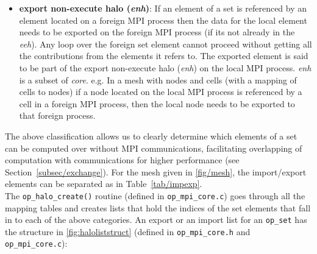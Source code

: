 \documentclass[11pt]{article}
\begin{document}
\begin{itemize}
\item \textbf{export non-execute halo (\textit{enh})}: If an element of a set is
referenced by an element located on a foreign MPI process then the data for the
local element needs to be exported on the foreign MPI process (if its not
already in the \textit{eeh}). Any loop over the foreign set element cannot
proceed without getting all the contributions from the elements it refers to.
The exported element is said to be part of the export non-execute halo
(\textit{enh}) on the local MPI process. \textit{enh} is a subset of
\textit{core}. e.g. In a mesh with nodes and cells (with a mapping of cells to
nodes) if a node located on the local MPI process is referenced by a cell in a
foreign MPI process, then the local node needs to be exported to that foreign
process.
\end{itemize}

\noindent The above classification allows us to clearly determine which elements
of a set can be computed over without MPI communications, facilitating
overlapping of computation with communications for higher performance (see
Section~\ref{subsec/exchange}). For the mesh given in \figurename{
\ref{fig/mesh}}, the import/export elements can be separated as in Table~\ref{tab/impexp}.\\




\noindent The \texttt{op\_halo\_create()} routine (defined in \texttt{op\_mpi\_core.c}) goes through all the mapping
tables and creates lists that hold the indices of the set elements that fall in to each of the above categories. An
export or an import list for an \texttt{op\_set} has the structure in \figurename{ \ref{fig:haloliststruct}} (defined in
\texttt{op\_mpi\_core.h} and
\texttt{op\_mpi\_core.c}):\\\vspace{-0pt}
\end{document}
